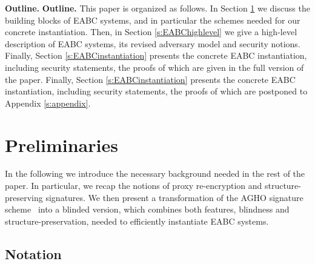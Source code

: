 \documentclass[runningheads]{llncs}
\begin{document}
\ifCANS
{\bf Outline.}
\else
\medskip\textbf{Outline.}
\fi
%
 This paper is organized as follows.
In Section \ref{s:preliminaries} we discuss the building blocks of EABC systems, and in particular the schemes needed for our concrete instantiation.
Then, in Section \ref{s:EABChighlevel} we give a high-level description of EABC systems, its revised adversary model and security notions.
\ifCANS
Finally, Section \ref{s:EABCinstantiation} presents the concrete EABC instantiation, including security statements, the proofs of which are given in the full version of the paper.
\else
Finally, Section \ref{s:EABCinstantiation} presents the concrete EABC instantiation, including security statements, the proofs of which are postponed to Appendix \ref{s:appendix}.
\fi



\section{Preliminaries}
\label{s:preliminaries}

In the following we introduce the necessary background needed in the rest of the paper.
In particular, we recap the notions of proxy re-encryption and structure-preserving signatures.
We then present a transformation of the AGHO signature scheme~\cite{AGHO:2011} into a blinded version, which combines both features, blindness and structure-preservation, needed to efficiently instantiate EABC systems.

\subsection{Notation}
\label{s:ZKP}
\end{document}

